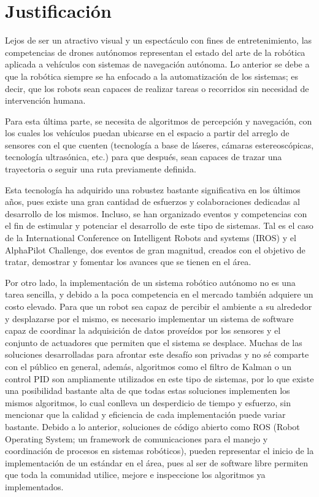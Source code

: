 \section{Justificación}
Lejos de ser un atractivo visual y un espectáculo con fines de entretenimiento, las competencias de drones autónomos representan el estado del arte de la robótica aplicada a vehículos con sistemas de navegación autónoma.
Lo anterior se debe a que la robótica siempre se ha enfocado a la automatización de los sistemas; es decir, que los robots sean capaces de realizar tareas o recorridos sin necesidad de intervención humana. 

Para esta última parte, se necesita de algoritmos de percepción y navegación, con los cuales los vehículos puedan ubicarse en el espacio a partir del arreglo de sensores con el que cuenten (tecnología a base de láseres, cámaras estereoscópicas, tecnología ultrasónica, etc.) para que después, sean capaces de trazar una trayectoria o seguir una ruta previamente definida.   

Esta tecnología ha adquirido una robustez bastante significativa en los últimos años, pues existe una gran cantidad de esfuerzos y colaboraciones dedicadas al desarrollo de los mismos. Incluso, se han organizado eventos y competencias con el fin de estimular y potenciar el desarrollo de este tipo de sistemas. Tal es el caso de la International Conference on Intelligent Robots and systems (IROS) y el AlphaPilot Challenge, dos eventos de gran magnitud, creados con el objetivo de tratar, demostrar y fomentar los avances que se tienen en el área.

Por otro lado, la implementación de un sistema robótico autónomo no es una tarea sencilla, y debido a la poca competencia en el mercado también adquiere un costo elevado. 
Para que un robot sea capaz de percibir el ambiente a su alrededor y desplazarse por el mismo, es necesario implementar un sistema de software capaz de coordinar la adquisición de datos proveídos por los sensores y el conjunto de actuadores que permiten que el sistema se desplace. Muchas de las soluciones desarrolladas para afrontar este desafío son privadas y no sé comparte con el público en general, además, algoritmos como el filtro de Kalman o un control PID son ampliamente utilizados en este tipo de sistemas, por lo que existe una posibilidad bastante alta de que todas estas soluciones implementen los mismos algoritmos, lo cual conlleva un desperdicio de tiempo y esfuerzo, sin mencionar que la calidad y eficiencia de cada implementación puede variar bastante.
Debido a lo anterior, soluciones de código abierto como ROS (Robot Operating System; un framework de comunicaciones para el manejo y coordinación de procesos en sistemas robóticos), pueden representar el inicio de la implementación de un estándar en el área, pues al ser de software libre permiten que toda la comunidad utilice, mejore e inspeccione los algoritmos ya implementados.

